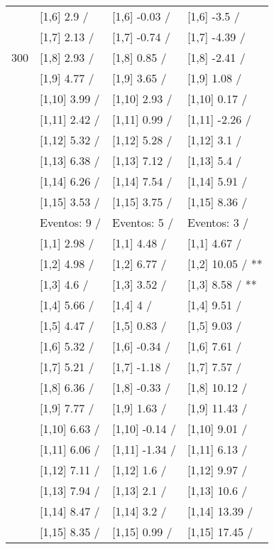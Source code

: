 \begin{table}
\begin{tabular}[t]{llll}
 & {}[1,6] 2.9  / & {}[1,6] -0.03  / & {}[1,6] -3.5  /\\
 & {}[1,7] 2.13  / & {}[1,7] -0.74  / & {}[1,7] -4.39  /\\
300 & {}[1,8] 2.93  / & {}[1,8] 0.85  / & {}[1,8] -2.41  /\\
\addlinespace
 & {}[1,9] 4.77  / & {}[1,9] 3.65  / & {}[1,9] 1.08  /\\
 & {}[1,10] 3.99  / & {}[1,10] 2.93  / & {}[1,10] 0.17  /\\
 & {}[1,11] 2.42  / & {}[1,11] 0.99  / & {}[1,11] -2.26  /\\
 & {}[1,12] 5.32  / & {}[1,12] 5.28  / & {}[1,12] 3.1  /\\
 & {}[1,13] 6.38  / & {}[1,13] 7.12  / & {}[1,13] 5.4  /\\
\addlinespace
 & {}[1,14] 6.26  / & {}[1,14] 7.54  / & {}[1,14] 5.91  /\\
 & {}[1,15] 3.53  / & {}[1,15] 3.75  / & {}[1,15] 8.36  /\\
 & Eventos:  9 / & Eventos:  5 / & Eventos:  3 /\\
 & {}[1,1] 2.98  / & {}[1,1] 4.48  / & {}[1,1] 4.67  /\\
 & {}[1,2] 4.98  / & {}[1,2] 6.77  / & {}[1,2] 10.05  / **\\
\addlinespace
 & {}[1,3] 4.6  / & {}[1,3] 3.52  / & {}[1,3] 8.58  / **\\
 & {}[1,4] 5.66  / & {}[1,4] 4  / & {}[1,4] 9.51  /\\
 & {}[1,5] 4.47  / & {}[1,5] 0.83  / & {}[1,5] 9.03  /\\
 & {}[1,6] 5.32  / & {}[1,6] -0.34  / & {}[1,6] 7.61  /\\
 & {}[1,7] 5.21  / & {}[1,7] -1.18  / & {}[1,7] 7.57  /\\
\addlinespace
500 & {}[1,8] 6.36  / & {}[1,8] -0.33  / & {}[1,8] 10.12  /\\
 & {}[1,9] 7.77  / & {}[1,9] 1.63  / & {}[1,9] 11.43  /\\
 & {}[1,10] 6.63  / & {}[1,10] -0.14  / & {}[1,10] 9.01  /\\
 & {}[1,11] 6.06  / & {}[1,11] -1.34  / & {}[1,11] 6.13  /\\
 & {}[1,12] 7.11  / & {}[1,12] 1.6  / & {}[1,12] 9.97  /\\
\addlinespace
 & {}[1,13] 7.94  / & {}[1,13] 2.1  / & {}[1,13] 10.6  /\\
 & {}[1,14] 8.47  / & {}[1,14] 3.2  / & {}[1,14] 13.39  /\\
 & {}[1,15] 8.35  / & {}[1,15] 0.99  / & {}[1,15] 17.45  /\\
\bottomrule
\end{tabular}
\end{table}
